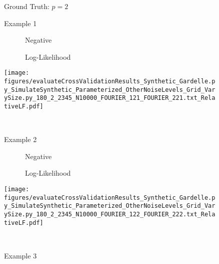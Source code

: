  \begin{figure}
\center

Ground Truth: $p = 2$

Example 1

\begin{minipage}[c]{0.8\linewidth}

\end{minipage}
\begin{minipage}[c]{0.19\linewidth}
\centering

\ \ \ \ \ \ Negative

\ \ \ \ \ \ Log-Likelihood

\texttt{[image: figures/evaluateCrossValidationResults\_Synthetic\_Gardelle.py\_SimulateSynthetic\_Parameterized\_OtherNoiseLevels\_Grid\_VarySize.py\_180\_2\_2345\_N10000\_FOURIER\_121\_FOURIER\_221.txt\_RelativeLF.pdf]}
\end{minipage}

\ 

Example 2

\begin{minipage}[c]{0.8\linewidth}

\end{minipage}
\begin{minipage}[c]{0.19\linewidth}
\centering

\ \ \ \ \ \ Negative

\ \ \ \ \ \ Log-Likelihood

\texttt{[image: figures/evaluateCrossValidationResults\_Synthetic\_Gardelle.py\_SimulateSynthetic\_Parameterized\_OtherNoiseLevels\_Grid\_VarySize.py\_180\_2\_2345\_N10000\_FOURIER\_122\_FOURIER\_222.txt\_RelativeLF.pdf]}
\end{minipage}

\ 

Example 3

\begin{minipage}[c]{0.8\linewidth}


\end{minipage}
\end{figure}
